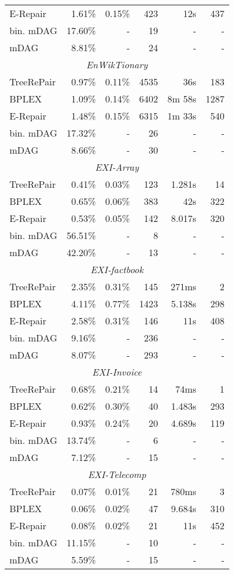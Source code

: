 \documentclass[12pt]{llncs}
\begin{document}
\begin{longtable}{lrrrrr}
			E-Repair&1.61\%&0.15\%&423&12s&437\\*
			bin. mDAG&17.60\%&-&19&-&-\\*
			mDAG&8.81\%&-&24&-&-\\
			\midrule\multicolumn{6}{c}{\emph{EnWikTionary}}\\*
			TreeRePair&0.97\%&0.11\%&4535&36s&183\\*
			BPLEX&1.09\%&0.14\%&6402&8m 58s&1287\\*
			E-Repair&1.48\%&0.15\%&6315&1m 33s&540\\*
			bin. mDAG&17.32\%&-&26&-&-\\*
			mDAG&8.66\%&-&30&-&-\\
			\midrule\multicolumn{6}{c}{\emph{EXI-Array}}\\*
			TreeRePair&0.41\%&0.03\%&123&1.281s&14\\*
			BPLEX&0.65\%&0.06\%&383&42s&322\\*
			E-Repair&0.53\%&0.05\%&142&8.017s&320\\*
			bin. mDAG&56.51\%&-&8&-&-\\*
			mDAG&42.20\%&-&13&-&-\\
			\midrule\multicolumn{6}{c}{\emph{EXI-factbook}}\\*
			TreeRePair&2.35\%&0.31\%&145&271ms&2\\*
			BPLEX&4.11\%&0.77\%&1423&5.138s&298\\*
			E-Repair&2.58\%&0.31\%&146&11s&408\\*
			bin. mDAG&9.16\%&-&236&-&-\\*
			mDAG&8.07\%&-&293&-&-\\
			\midrule\multicolumn{6}{c}{\emph{EXI-Invoice}}\\*
			TreeRePair&0.68\%&0.21\%&14&74ms&1\\*
			BPLEX&0.62\%&0.30\%&40&1.483s&293\\*
			E-Repair&0.93\%&0.24\%&20&4.689s&119\\*
			bin. mDAG&13.74\%&-&6&-&-\\*
			mDAG&7.12\%&-&15&-&-\\
			\midrule\multicolumn{6}{c}{\emph{EXI-Telecomp}}\\*
			TreeRePair&0.07\%&0.01\%&21&780ms&3\\*
			BPLEX&0.06\%&0.02\%&47&9.684s&310\\*
			E-Repair&0.08\%&0.02\%&21&11s&452\\*
			bin. mDAG&11.15\%&-&10&-&-\\*
			mDAG&5.59\%&-&15&-&-\\

\end{longtable}
\end{document}
